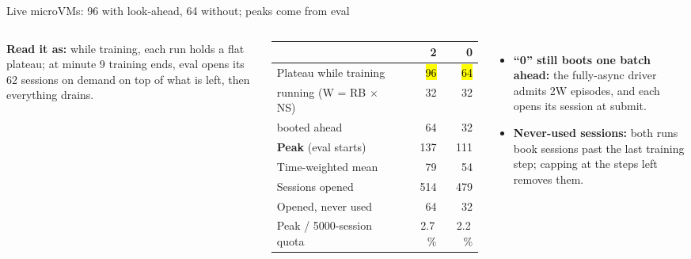 \begin{frame}{Live microVMs: 96 with look-ahead, 64 without; peaks come from eval}
\begin{columns}[T]
\centering{}\par
\vspace{1.5mm}\raggedright
{\scriptsize\textbf{Read it as:} while training, each run holds a flat plateau; at minute 9 training ends, eval opens its 62 sessions on demand on top of what is left, then everything drains.\par}
\scriptsize\setlength{\tabcolsep}{3pt}
\begin{tabularx}{\linewidth}{@{}Yrr@{}}
\toprule
{} & \textbf{2} & \textbf{0}\\
\midrule
Plateau while training & \hl{96} & \hl{64}\\
\quad running (W = RB $\times$ NS) & 32 & 32\\
\quad booted ahead & 64 & 32\\
\textbf{Peak} (eval starts) & 137 & 111\\
Time-weighted mean & 79 & 54\\
Sessions opened & 514 & 479\\
Opened, never used & 64 & 32\\
Peak / 5000-session quota & 2.7\,\% & 2.2\,\%\\
\bottomrule
\end{tabularx}
\par\vspace{1.5mm}
\begin{itemize}\tiny\setlength{\itemsep}{0.4mm}
\item \textbf{``0'' still boots one batch ahead:} the fully-async driver admits 2W episodes, and each opens its session at submit.
\item \textbf{Never-used sessions:} both runs book sessions past the last training step; capping at the steps left removes them.
\end{itemize}
\end{columns}
\end{frame}

